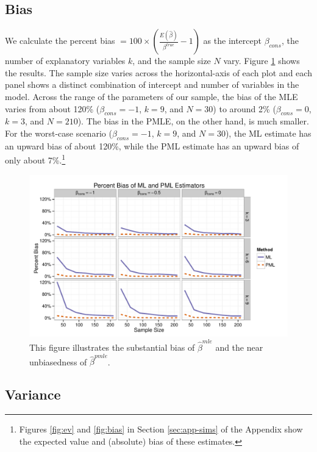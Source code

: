\documentclass[12pt]{article}
\begin{document}
\subsection*{Bias}

We calculate the percent bias $= 100 \times \left(\frac{E(\hat{\beta})}{\beta^{true}} - 1 \right)$ as the intercept $\beta_{cons}$, the number of explanatory variables $k$, and the sample size $N$ vary.
Figure \ref{fig:sims-coef-perc-bias} shows the results.
The sample size varies across the horizontal-axis of each plot and each panel shows a distinct combination of intercept and number of variables in the model.
Across the range of the parameters of our sample, the bias of the MLE varies from about 120\% ($\beta_{cons} = -1$, $k = 9$, and $N = 30$) to around 2\% ($\beta_{cons} = 0$, $k = 3$, and $N = 210$).
The bias in the PMLE, on the other hand, is much smaller.
For the worst-case scenario ($\beta_{cons} = -1$, $k = 9$, and $N = 30$), the ML estimate has an upward bias of about 120\%, while the PML estimate has an upward bias of only about 7\%.\footnote{Figures \ref{fig:ev} and \ref{fig:bias} in Section \ref{sec:app-sims} of the Appendix show the expected value and (absolute) bias of these estimates.}

\begin{figure}[h]
\begin{center}
\includegraphics[width = \textwidth]{figs/sims-percent-bias.pdf}
\caption{This figure illustrates the substantial bias of $\hat{\beta}^{mle}$ and the near unbiasedness of $\hat{\beta}^{pmle}$.}\label{fig:sims-coef-perc-bias}
\end{center}
\end{figure}

\subsection*{Variance}
\end{document}
